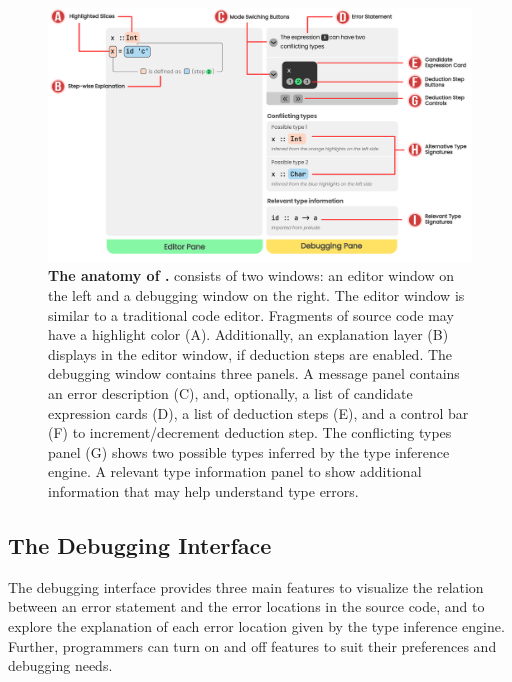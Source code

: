 \begin{figure}
    \centering
    \includegraphics[width=\textwidth]{images/atonomy.pdf}
    \caption{
        \textbf{The anatomy of \chameleon{}.}
        \chameleon{} consists of two windows: an editor window on the left and a
        debugging window on the right. The editor window is similar to a
        traditional code editor. Fragments of source code may have a highlight
        color (A). Additionally, an explanation layer (B) displays in the editor
        window, if deduction steps are enabled. The debugging window contains
        three panels. A message panel contains an error description (C), and, optionally,
        a list of candidate expression cards (D), a list of deduction steps (E), 
        and a control bar (F) to increment/decrement deduction step. 
        The conflicting types
        panel (G) shows two possible types inferred by the type inference
        engine. A relevant type information panel to show additional information
        that may help understand type errors.
    }
    \label{fig:anatomy}
\end{figure}


\subsection{The Debugging Interface}

The \chameleon{} debugging interface provides three main features to visualize the relation between an error statement and the error locations in the source code, and to explore the explanation of each error location given by the type inference engine. Further, programmers  can turn on and off features to suit their preferences and debugging needs.



